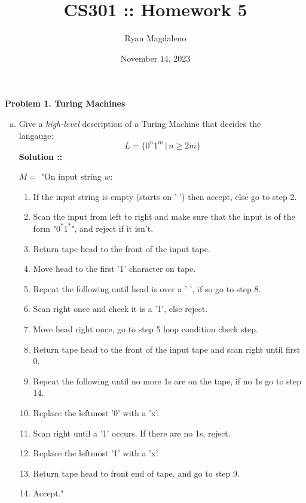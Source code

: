 \documentclass[11pt]{article}
\date{November 14, 2023}
\title{CS301 :: Homework 5}
\author{Ryan Magdaleno}
\begin{document}
\maketitle


\textbf{Problem 1. Turing Machines}

\begin{enumerate}[a)]
    \item
    Give a \textit{high-level} description of a Turing Machine that decides the
    \\ langauge:
    $$L = \{0^n1^m \,|\, n\ge 2m\}$$
    \vspace{5px}\textbf{Solution ::}

    $M = $ "On input string $w$:
    \begin{enumerate}[\hspace{15px}1.]
        \item
        If the input string is empty (starts on ' ') then accept, else go to step 2.
        \item
        Scan the input from left to right and make sure that the input is of the form
        "$0^*1^*$", and reject if it isn't.
        \item 
        Return tape head to the front of the input tape.
        \item 
        Move head to the first '1' character on tape.
        \item 
        Repeat the following until head is over a ' ', if so go to step 8.
        \item 
        \hspace{15px}Scan right once and check it is a '1', else reject.
        \item 
        \hspace{15px}Move head right once, go to step 5 loop condition check step.
        \item Return tape head to the front of the input tape and scan right until first
        0.
        \item 
        Repeat the following until no more 1s are on the tape, if no 1s go to step 14.
        \item
        \hspace{15px}Replace the leftmost '0' with a 'x'.
        \item 
        \hspace{15px}Scan right until a '1' occurs. If there are no 1s, reject.
        \item
        \hspace{15px}Replace the leftmost '1' with a 'x'.
        \item 
        \hspace{15px}Return tape head to front end of tape, and go to step 9.
        \item
        Accept."
    \end{enumerate}
    \pagebreak


\end{enumerate}
\end{document}
